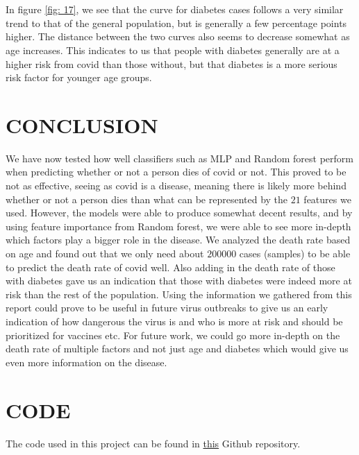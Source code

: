 \documentclass[english,notitlepage,reprint,nofootinbib]{revtex4-1}  %
\begin{document}
\\
\\
In figure \ref{fig: 17}, we see that the curve for diabetes cases follows a very similar trend to that of the general population, but is generally a few percentage points higher. The distance between the two curves also seems to decrease somewhat as age increases. This indicates to us that people with diabetes generally are at a higher risk from covid than those without, but that diabetes is a more serious risk factor for younger age groups. %

\section{CONCLUSION}\label{sec: CONCLUSION}
We have now tested how well classifiers such as MLP and Random forest perform when predicting whether or not a person dies of covid or not. This proved to be not as effective, seeing as covid is a disease, meaning there is likely more behind whether or not a person dies than what can be represented by the $21$ features we used. However, the models were able to produce somewhat decent results, and by using feature importance from Random forest, we were able to see more in-depth which factors play a bigger role in the disease. We analyzed the death rate based on age and found out that we only need about $200 000$ cases (samples) to be able to predict the death rate of covid well. Also adding in the death rate of those with diabetes gave us an indication that those with diabetes were indeed more at risk than the rest of the population. Using the information we gathered from this report could prove to be useful in future virus outbreaks to give us an early indication of how dangerous the virus is and who is more at risk and should be prioritized for vaccines etc. For future work, we could go more in-depth on the death rate of multiple factors and not just age and diabetes which would give us even more information on the disease. 


\section{CODE}\label{sec: CODE}
The code used in this project can be found in \href{https://github.com/mathiasmellemstuen/FYS_STK4155_Prosjekt_3}{this} Github repository.
\end{document}
